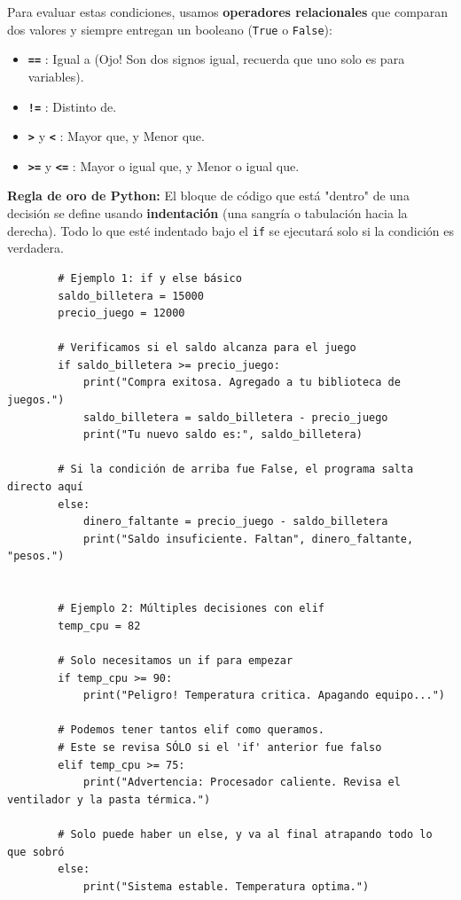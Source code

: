 \documentclass[11pt, a4paper]{article}
\begin{document}
	Para evaluar estas condiciones, usamos \textbf{operadores relacionales} que comparan dos valores y siempre entregan un booleano (\texttt{True} o \texttt{False}):
	\begin{itemize}
		\item \textbf{\texttt{==}} : Igual a (Ojo! Son dos signos igual, recuerda que uno solo es para variables).
		\item \textbf{\texttt{!=}} : Distinto de.
		\item \textbf{\texttt{>}} y \textbf{\texttt{<}} : Mayor que, y Menor que.
		\item \textbf{\texttt{>=}} y \textbf{\texttt{<=}} : Mayor o igual que, y Menor o igual que.
	\end{itemize}
	
	\textbf{Regla de oro de Python:} El bloque de código que está "dentro" de una decisión se define usando \textbf{indentación} (una sangría o tabulación hacia la derecha). Todo lo que esté indentado bajo el \texttt{if} se ejecutará solo si la condición es verdadera. \\
	
	\begin{lstlisting}
		# Ejemplo 1: if y else básico
		saldo_billetera = 15000
		precio_juego = 12000
		
		# Verificamos si el saldo alcanza para el juego
		if saldo_billetera >= precio_juego:
			print("Compra exitosa. Agregado a tu biblioteca de juegos.")
			saldo_billetera = saldo_billetera - precio_juego
			print("Tu nuevo saldo es:", saldo_billetera)
		
		# Si la condición de arriba fue False, el programa salta directo aquí
		else:
			dinero_faltante = precio_juego - saldo_billetera
			print("Saldo insuficiente. Faltan", dinero_faltante, "pesos.")
		
		
		# Ejemplo 2: Múltiples decisiones con elif
		temp_cpu = 82
		
		# Solo necesitamos un if para empezar
		if temp_cpu >= 90:
			print("Peligro! Temperatura critica. Apagando equipo...")
		
		# Podemos tener tantos elif como queramos. 
		# Este se revisa SÓLO si el 'if' anterior fue falso
		elif temp_cpu >= 75:
			print("Advertencia: Procesador caliente. Revisa el ventilador y la pasta térmica.")
		
		# Solo puede haber un else, y va al final atrapando todo lo que sobró
		else:
			print("Sistema estable. Temperatura optima.")
	\end{lstlisting}
	
\end{document}
